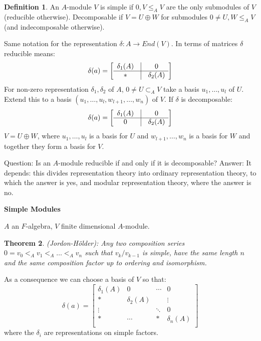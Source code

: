 \documentclass[12pt]{amsart}
\newtheorem{theorem}{Theorem}[section]
\theoremstyle{definition}
\newtheorem{definition}[theorem]{Definition}
\begin{document}
\begin{definition}
An $A$-module $V$ is simple if $0, V \leq_{A} V$ are the only submodules of $V$ (reducible otherwise).
Decomposable if $V = U \oplus W$ for submodules $0 \neq U, W \leq_{A} V$ (and indecomposable otherwise).
\end{definition}
Same notation for the representation $\delta: A \rightarrow End(V)$. In terms of matrices $\delta$ reducible means:
 \begin{equation*}
\mbox{$\delta (a )$} = \left[
\begin{array}{ccc}
     \delta_{1} (A) & \vline & 0 \\
     \hline
     \ast & \vline & \delta_{2} (A) \\
\end{array}
\right]
\end{equation*}
For non-zero representation $\delta_{1}, \delta_{2}$ of $A$, $0 \neq U \subset_{A} V$ take a basis $u_{1}, \ldots, u_{l}$ of $U$. Extend this to a basis $(u_{1}, \ldots, u_{l}, w_{l+1}, \ldots, w_{n})$ of $V$. If $\delta$ is decomposable:
 \begin{equation*}
\mbox{$\delta (a )$} = \left[
\begin{array}{ccc}
     \delta_{1} (A) & \vline & 0 \\
     \hline
     0 & \vline & \delta_{2} (A) \\
\end{array}
\right]
\end{equation*}
$V = U \oplus W$, where $u_{1}, \ldots, u_{l}$ is a basis for $U$ and $w_{l + 1}, \ldots, w_{n}$ is a basis for $W$ and together they form a basis for $V$.

Question: Is an $A$-module reducible if and only if it is decomposable?
Answer: It depends: this divides representation theory into ordinary representation theory, to which the answer is yes, and modular representation theory, where the answer is no.

\begin{center}
\textbf{Simple Modules}
\end{center}
$A$ an $F$-algebra, $V$ finite dimensional $A$-module.

\begin{theorem}
(Jordon-H\"{o}lder): Any two composition series $0 = v_{0} <_{A} v_{1} <_{A} \ldots <_{A} v_{n}$ such that $v_{k} / v_{k - 1}$ is simple, have the same length $n$ and the same composition factor up to ordering and isomorphism.
\end{theorem}
As a consequence we can choose a basis of $V$ so that:
\begin{equation*}
\mbox{$\delta (a )$} = \left[
\begin{array}{cccc}
     \delta_{1} (A) & 0 & \cdots & 0\\
     \ast & \delta_{2} (A)& \  & \vdots\\
     \vdots & \  & \ddots & 0 \\
     \ast & \cdots & \ast & \delta_{n} (A)\\
\end{array}
\right]
\end{equation*}
where the $\delta_{i}$  are representations on simple factors.
\end{document}
